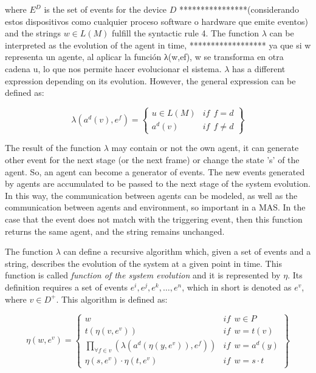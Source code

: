 \documentclass[runningheads]{llncs}
\begin{document}
where $E^D$ is the set of events for the device $D$ ****************(considerando estos dispositivos como cualquier proceso software o hardware que emite eventos) and the strings $w \in L(M)$ fulfill the
syntactic rule 4. The function $\lambda$ can be interpreted as the evolution of the agent in time, ****************** ya que si w representa un agente, al aplicar la función λ(w,ef), w se transforma en otra cadena u, lo que nos permite hacer evolucionar el sistema. $\lambda$ has a different expression depending on its evolution. However, the general expression can be defined as:

\begin{equation}
    \lambda (a^{d}(v),e^{f})=
    \left\{
    \begin{array}{ll}
        u \in L(M) & \mathit{if}  \ \ f = d \\
        a^{d}(v)  & \mathit{if}  \ \ f \neq d
    \end{array}\right\}
\end{equation}


The result of the function $\lambda$ may contain or not the own agent, it can generate other
event for the next stage (or the next frame) or change the state 's' of the agent. So, an agent can become a generator of events. The new events generated by agents are accumulated to be passed to the next stage of the system
evolution. In this way, the communication between agents can be modeled, as well as the communication between agents and environment, so important in a MAS. In the case that the event does not match with the triggering event, then this function returns the same agent, and the string remains unchanged. 

The function $\lambda$ can define a recursive algorithm which, given a set of
events and a string, describes the evolution of the system at a given point
in time. This function is called \textit{function of the system evolution} and
it is represented by $\eta$. Its definition requires a set of events
$e^i, e^j, e^k, \dots, e^n$, which in short is denoted as $e^v$, where $v
\in D^+$. This algorithm is defined as:

\begin{equation}
    \eta (w, e^v) = \left\{
    \begin{array}{ll}
        w   & \mathit{if}  \ \ w \in P  \\

        t(\eta (v, e^v))    & \mathit{if}  \ \  w = t(v)  \\

        \underset{\forall f \in v}{ \prod }(\lambda (a^d (\eta
            (y, e^v)), e^f))    & \mathit{if}  \ \ w = a^d(y)
\\

        \eta (s, e^v) \cdot \eta (t, e^v)   & \mathit{if}  \
\  w = s \cdot t
    \end{array}\right\}
\end{equation}
\end{document}
